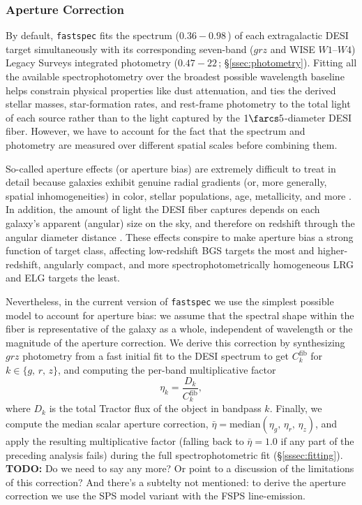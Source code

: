 \documentclass[modern,linenumbers]{aastex701}
\newcommand{\todo}[1]{{\color{red}\textbf{TODO:} #1}}
\newcommand{\fastspec}{\texttt{fastspec}}
\begin{document}
\subsubsection{Aperture Correction}
\label{sssec:apercorr}

By default, \fastspec{} fits the spectrum ($0.36-0.98$\,\micron) of
each extragalactic DESI target simultaneously with its corresponding
seven-band ($grz$ and WISE $W1$--$W4$) Legacy Surveys integrated
photometry ($0.47-22$\,\micron; \S\ref{ssec:photometry}). Fitting all
the available spectrophotometry over the broadest possible wavelength
baseline helps constrain physical properties like dust attenuation,
and ties the derived stellar masses, star-formation rates, and
rest-frame photometry to the total light of each source rather than to
the light captured by the $1\farcs5$-diameter DESI fiber. However, we
have to account for the fact that the spectrum and photometry are
measured over different spatial scales before combining them.

So-called aperture effects (or aperture bias) are extremely difficult
to treat in detail because galaxies exhibit genuine radial gradients
(or, more generally, spatial inhomogeneities) in color, stellar
populations, age, metallicity, and more \citep[and references
  therein]{sanchez20a}. In addition, the amount of light the DESI
fiber captures depends on each galaxy's apparent (angular) size on the
sky, and therefore on redshift through the angular diameter distance
\citep{hogg99a}. These effects conspire to make aperture bias a strong
function of target class, affecting low-redshift BGS targets the most
and higher-redshift, angularly compact, and more
spectrophotometrically homogeneous LRG and ELG targets the least.

Nevertheless, in the current version of \fastspec{} we use the
simplest possible model to account for aperture bias: we assume that
the spectral shape within the fiber is representative of the galaxy as
a whole, independent of wavelength or the magnitude of the aperture
correction. We derive this correction by synthesizing $grz$ photometry
from a fast initial fit to the DESI spectrum to get $C_k^\mathrm{fib}$
for $k \in \{g,\,r,\,z\}$, and computing the per-band multiplicative
factor
\begin{equation}
  \eta_k = \frac{D_k}{C_k^\mathrm{fib}},
  \label{eq:apercorr}
\end{equation}
where $D_k$ is the total Tractor flux of the object in bandpass
$k$. Finally, we compute the median scalar aperture correction,
$\bar{\eta}=\mathrm{median}(\eta_g,\,\eta_r,\,\eta_z)$, and apply the
resulting multiplicative factor (falling back to $\bar{\eta}=1.0$ if
any part of the preceding analysis fails) during the full
spectrophotometric fit (\S\ref{sssec:fitting}). \todo{Do we need to
  say any more? Or point to a discussion of the limitations of this
  correction? And there's a subtelty not mentioned: to derive the
  aperture correction we use the SPS model variant with the FSPS
  line-emission.}
\end{document}
